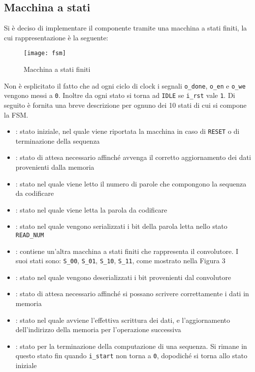 \documentclass{article}
\begin{document}
\subsection{Macchina a stati}
Si è deciso di implementare il componente tramite una macchina a stati finiti, la cui rappresentazione è la seguente:
\begin{figure}[H]
    \centering
    \texttt{[image: fsm]}
    \caption{Macchina a stati finiti}
    \label{fig:fsm}
\end{figure}
Non è esplicitato il fatto che ad ogni ciclo di clock i segnali \verb^o_done^, \verb^o_en^ e \verb^o_we^ vengono messi a \verb^0^. Inoltre da ogni stato si torna ad \verb^IDLE^ se \verb^i_rst^ vale \verb^1^.
\newpage
Di seguito è fornita una breve descrizione per ognuno dei 10 stati di cui si compone la FSM.
\begin{itemize}
    \item[\verb^IDLE^]: stato iniziale, nel quale viene riportata la macchina in caso di \verb^RESET^ o di terminazione della sequenza
    \item[\verb^READ\_MEM\_WAIT^]: stato di attesa necessario affinché avvenga il corretto aggiornamento dei dati provenienti dalla memoria
    \item[\verb^READ\_W^]: stato nel quale viene letto il numero di parole che compongono la sequenza da codificare
    \item[\verb^READ\_NUM^]: stato nel quale viene letta la parola da codificare
    \item[\verb^SERIALIZE\_NUM^]: stato nel quale vengono serializzati i bit della parola letta nello stato \verb^READ_NUM^
    \item[\verb^CONV^]: contiene un'altra macchina a stati finiti che rappresenta il convolutore. I suoi stati sono: \verb^S_00^, \verb^S_01^, \verb^S_10^, \verb^S_11^, come mostrato nella Figura 3
    \item[\verb^DESERIALIZE\_NUM^]: stato nel quale vengono deserializzati i bit provenienti dal convolutore
    \item[\verb^WRITE\_MEM\_WAIT^]: stato di attesa necessario affinché si possano scrivere correttamente i dati in memoria
    \item[\verb^WRITE\_MEM^]: stato nel quale avviene l'effettiva scrittura dei dati, e l'aggiornamento dell'indirizzo della memoria per l'operazione successiva
    \item[\verb^DONE^]: stato per la terminazione della computazione di una sequenza. Si rimane in questo stato fin quando \verb^i_start^ non torna a \verb^0^, dopodiché si torna allo stato iniziale
\end{itemize}
\end{document}
